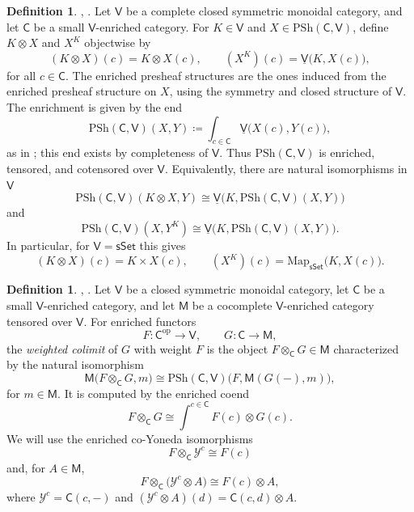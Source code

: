 \documentclass{amsart}
\newcommand{\cat}[1]{\mathsf{#1}}
\newcommand{\sset}{\cat{sSet}}
\newcommand{\Map}{\mathrm{Map}}
\newcommand{\psh}{\mathrm{PSh}}
\renewcommand{\op}{\mathrm{op}}
\newcommand{\Yo}{\mathscr{Y}}
\theoremstyle{definition}
\newtheorem{definition}[equation]{Definition}
\numberwithin{equation}{subsection}
\numberwithin{subsubsection}{subsection}
\begin{document}
\begin{definition}\label{def:tensor.cotensor.presheaves}
  \textnormal{\cite[Section~3.7]{Kel82}},
  \textnormal{\cite[Definitions~3.7.2--3]{Rie14}}.
  Let \( \cat{V} \) be a complete closed symmetric monoidal
  category, and let \( \cat{C} \) be a small \( \cat{V} \)-enriched category.
  For \( K\in\cat{V} \) and \( X\in \psh(\cat{C},\cat{V}) \), define
  \( K\otimes X \) and \( X^{K} \) objectwise by
  \[
    (K\otimes X)(c)=K\otimes X(c),
    \qquad
    (X^{K})(c)=\underline{\cat{V}}\bigl(K,X(c)\bigr),
  \]
  for all \( c\in\cat{C} \). The enriched presheaf structures are the
  ones induced from the enriched presheaf structure on \( X \), using the
  symmetry and closed structure of \( \cat{V} \). The enrichment is
  given by the end
  \[
    \psh(\cat{C},\cat{V})(X,Y)
    \coloneqq
    \int_{c\in\cat{C}}
    \underline{\cat{V}}\bigl(X(c),Y(c)\bigr),
  \]
  as in \cite[Section~2.2]{Kel82}; this end exists by completeness of
  \(\cat{V}\). Thus
  \( \psh(\cat{C},\cat{V}) \) is enriched, tensored, and cotensored over \(
  \cat{V} \).
  Equivalently, there are natural isomorphisms in
  \( \cat{V} \)
  \[
    \psh(\cat{C},\cat{V})(K\otimes X,Y)
    \cong
    \underline{\cat{V}}\bigl(
      K,\psh(\cat{C},\cat{V})(X,Y)
    \bigr)
  \]
  and
  \[
    \psh(\cat{C},\cat{V})(X,Y^{K})
    \cong
    \underline{\cat{V}}\bigl(
      K,\psh(\cat{C},\cat{V})(X,Y)
    \bigr).
  \]
  In particular, for \( \cat{V}=\sset \) this gives
  \[
    (K\otimes X)(c)=K\times X(c),
    \qquad
    (X^{K})(c)=\Map_{\sset}\bigl(K,X(c)\bigr).
  \]
\end{definition}

\begin{definition}\label{def:weighted.colimit}
  \textnormal{\cite[Section~3.10]{Kel82}},
  \textnormal{\cite[Definition~7.4.1]{Rie14}}.
  Let \( \cat{V} \) be a closed symmetric monoidal category, let
  \( \cat{C} \) be a small \( \cat{V} \)-enriched category, and let
  \( \cat{M} \) be a cocomplete \( \cat{V} \)-enriched category tensored over
  \( \cat{V} \). For enriched functors
  \[
    F:\cat{C}^{\op}\to\cat{V},
    \qquad
    G:\cat{C}\to \cat{M},
  \]
  the \emph{weighted colimit} of \(G\) with weight \(F\) is the object
  \(F\otimes_{\cat{C}}G\in\cat{M}\) characterized by the natural isomorphism
  \[
    \cat{M}\bigl(F\otimes_{\cat{C}}G,m\bigr)
    \cong
    \psh(\cat{C},\cat{V})
    \bigl(F,\cat{M}(G(-),m)\bigr),
  \]
  for \(m\in\cat{M}\). It is computed by the enriched coend
  \[
    F\otimes_{\cat{C}}G
    \cong
    \int^{c\in \cat{C}} F(c)\otimes G(c).
  \]
  We will use the enriched co-Yoneda
  isomorphisms
  \[
    F\otimes_{\cat{C}}\Yo^{c}
    \cong
    F(c)
  \]
  and, for \(A\in\cat{M}\),
  \[
    F\otimes_{\cat{C}}\bigl(\Yo^{c}\otimes A\bigr)
    \cong
    F(c)\otimes A,
  \]
  where \(\Yo^{c}=\cat{C}(c,-)\) and
  \((\Yo^{c}\otimes A)(d)=\cat{C}(c,d)\otimes A\).
\end{definition}
\end{document}
